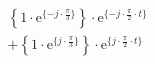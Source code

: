 \[
\begin{split}
&   \left \{ 1 \cdot \textrm{e}^{\{ -j \cdot \frac{\pi}{3} \}} \right \} \cdot \textrm{e}^{\{- j \cdot \frac{\pi}{2} \cdot t \}}\\
&+  \left \{ 1 \cdot \textrm{e}^{\{  j \cdot \frac{\pi}{3} \}} \right \} \cdot \textrm{e}^{\{  j \cdot \frac{\pi}{2} \cdot t \}}\\
\end{split}
\]
